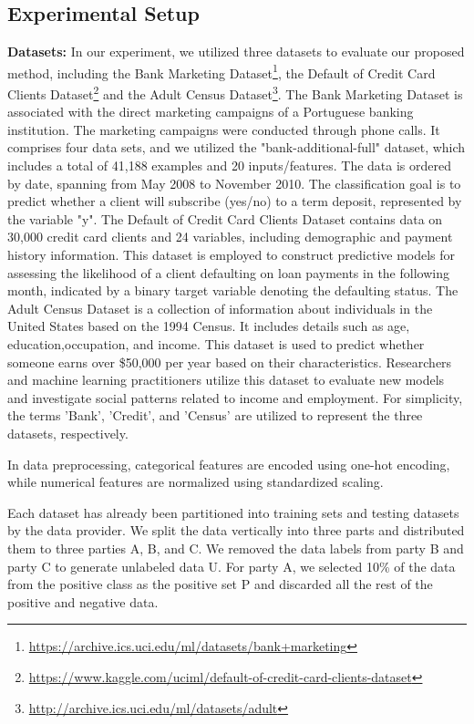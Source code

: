 \documentclass[10pt,journal,compsoc]{IEEEtran}
\begin{document}
	\subsection{Experimental Setup}
\textbf{Datasets:} In our experiment, we utilized three datasets to evaluate our proposed method, including the Bank Marketing Dataset\footnote{\label{bank}\url{https://archive.ics.uci.edu/ml/datasets/bank+marketing}}, the Default of Credit Card Clients Dataset\footnote{\sloppy \label{credit}\url{https://www.kaggle.com/uciml/default-of-credit-card-clients-dataset}} and the Adult Census Dataset\footnote{\label{adult}\url{http://archive.ics.uci.edu/ml/datasets/adult}}. The Bank Marketing Dataset is associated with the direct marketing campaigns of a Portuguese banking institution. The marketing campaigns were conducted through phone calls. It comprises four data sets, and we utilized the "bank-additional-full" dataset, which includes a total of 41,188 examples and 20 inputs/features. The data is ordered by date, spanning from May 2008 to November 2010. The classification goal is to predict whether a client will subscribe (yes/no) to a term deposit, represented by the variable "y". The Default of Credit Card Clients Dataset contains data on 30,000 credit card clients and 24 variables, including demographic and payment history information. This dataset is employed to construct predictive models for assessing the likelihood of a client defaulting on loan payments in the following month, indicated by a binary target variable denoting the defaulting status. The Adult Census Dataset is a collection of information about individuals in the United States based on the 1994 Census. It includes details such as age, education,occupation, and income. This dataset is used to predict whether someone earns over \$50,000 per year based on their characteristics. Researchers and machine learning practitioners utilize this dataset to evaluate new models and investigate social patterns related to income and employment. For simplicity, the terms 'Bank', 'Credit', and 'Census' are utilized to represent the three datasets, respectively.

In data preprocessing, categorical features are encoded using one-hot encoding, while numerical features are normalized using standardized scaling.

Each dataset has already been partitioned into training sets and testing datasets by the data provider. We split the data vertically into three parts and distributed them to three parties A, B, and C. We removed the data labels from party B and party C to generate unlabeled data U. For party A, we selected 10\% of the data from the positive class as the positive set P and discarded all the rest of the positive and negative data.
\end{document}
